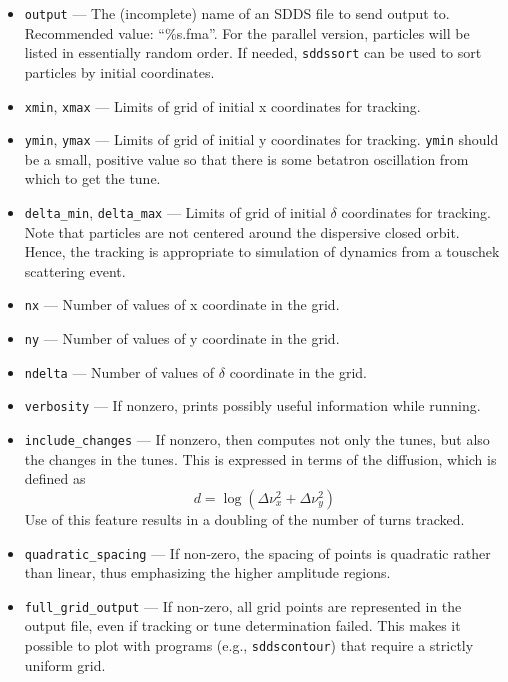 \documentclass[11pt]{article}
\begin{document}
\begin{itemize}
\item \verb|output| --- The (incomplete) name of an SDDS file to send output to.  
 Recommended value: ``\%s.fma''.  For the parallel version, particles will be listed in essentially
 random order.  If needed, \verb|sddssort| can be used to sort particles by initial coordinates.
\item \verb|xmin|, \verb|xmax| --- Limits of grid of initial x coordinates for tracking.             
\item \verb|ymin|, \verb|ymax| --- Limits of grid of initial y coordinates for tracking.             
 \verb|ymin| should be a small, positive value so that there                               
 is some betatron oscillation from which to get the tune.                      
\item \verb|delta_min|, \verb|delta_max| --- Limits of grid of initial $\delta$ coordinates
for tracking.  Note that particles are not centered around the dispersive closed orbit.  Hence,
the tracking is appropriate to simulation of dynamics from a touschek scattering event.
\item \verb|nx| --- Number of values of x coordinate in the grid.
\item \verb|ny| --- Number of values of y coordinate in the grid.
\item \verb|ndelta| --- Number of values of $\delta$ coordinate in the grid.
\item \verb|verbosity| --- If nonzero, prints possibly useful information while running.
\item \verb|include_changes| --- If nonzero, then computes not only the tunes, but also
        the changes in the tunes.  This is expressed in terms of the diffusion, which is defined
        as 
\begin{equation}
  d = \log \left(\Delta\nu_x^2 + \Delta\nu_y^2\right)
\end{equation}
Use of this feature results in a doubling of the number of turns tracked.
\item \verb|quadratic_spacing| --- If non-zero, the spacing of points is quadratic rather than linear, thus emphasizing
  the higher amplitude regions.
\item \verb|full_grid_output| --- If non-zero, all grid points are represented in the output file, even if tracking or
  tune determination failed. This makes it possible to plot with programs (e.g., \verb|sddscontour|) that require
  a strictly uniform grid.
\end{itemize}
\end{document}
